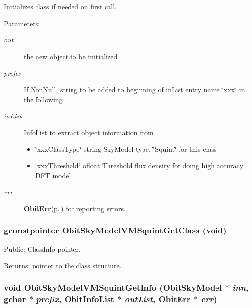 Initializes class if needed on first call. \begin{Desc}
\item[Parameters:]
\begin{description}
\item[{\em out}]the new object.to be initialized \item[{\em prefix}]If Non\-Null, string to be added to beginning of in\-List entry name \char`\"{}xxx\char`\"{} in the following \item[{\em in\-List}]Info\-List to extract object information from \begin{itemize}
\item \char`\"{}xxx\-Class\-Type\char`\"{} string Sky\-Model type, \char`\"{}Squint\char`\"{} for this class \item \char`\"{}xxx\-Threshold\char`\"{} ofloat Threshold flux density for doing high accuracy DFT model \end{itemize}
\item[{\em err}]{\bf Obit\-Err}{\rm (p.\,\pageref{structObitErr})} for reporting errors. \end{description}
\end{Desc}
\subsubsection{\setlength{\rightskip}{0pt plus 5cm}gconstpointer Obit\-Sky\-Model\-VMSquint\-Get\-Class (void)}\label{ObitSkyModelVMSquint_8h_a10}


Public: Class\-Info pointer. 

\begin{Desc}
\item[Returns:]pointer to the class structure. \end{Desc}
\subsubsection{\setlength{\rightskip}{0pt plus 5cm}void Obit\-Sky\-Model\-VMSquint\-Get\-Info ({\bf Obit\-Sky\-Model} $\ast$ {\em inn}, gchar $\ast$ {\em prefix}, {\bf Obit\-Info\-List} $\ast$ {\em out\-List}, {\bf Obit\-Err} $\ast$ {\em err})}\label{ObitSkyModelVMSquint_8h_a15}


